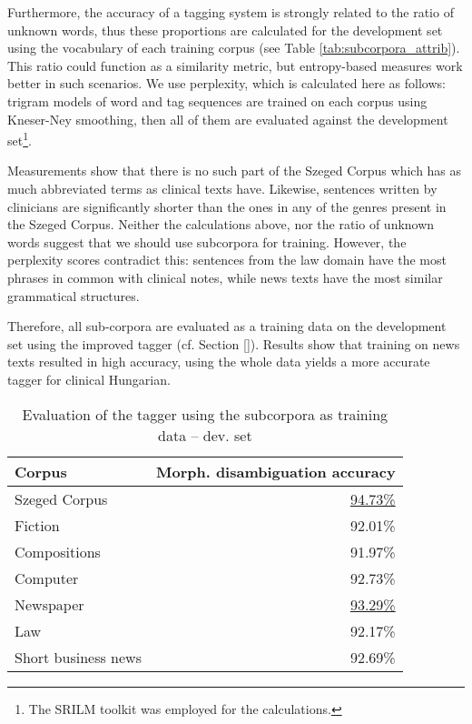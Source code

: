 Furthermore, the accuracy of a tagging system is strongly related to the ratio of unknown words, thus these proportions are calculated for the development set using the vocabulary of each training corpus (see Table \ref{tab:subcorpora_attrib}). This ratio could function as a similarity metric, but entropy-based measures work better \cite{kilgarriff1998measures} in such scenarios. We use perplexity, which is calculated here as follows: trigram models of word and tag sequences are trained on each corpus using Kneser-Ney smoothing, then all of them are evaluated against the development set\footnote{The SRILM toolkit \cite{stolcke2002srilm} was employed for the calculations.}.

Measurements show that there is no such part of the Szeged Corpus which has as much abbreviated terms as clinical texts have. Likewise, sentences written by clinicians are significantly shorter than the ones in any of the genres present in the Szeged Corpus. Neither the calculations above, nor the ratio of unknown words suggest that we should use subcorpora for training. However, the perplexity scores contradict this: sentences from the law domain have the most phrases in common with clinical notes, while news texts have the most similar grammatical structures. 

Therefore, all sub-corpora are evaluated as a training data on the development set using the improved tagger (cf. Section \ref{}). Results show that training on news texts resulted in high accuracy, using the whole data yields a more accurate tagger for clinical Hungarian.

\begin{table}
\centering
\caption{Evaluation of the tagger using the subcorpora as training data -- dev. set}
\label{tab:eval_subcorpora}
\begin{tabular}{ l r } 
\hline
Corpus & Morph. disambiguation accuracy \\
\hline
Szeged Corpus & \underline{94.73\%} \\
\hspace{0.2cm} Fiction & 92.01\% \\
\hspace{0.2cm} Compositions & 91.97\% \\
\hspace{0.2cm} Computer & 92.73\% \\
\hspace{0.2cm} Newspaper & \underline{93.29\%} \\
\hspace{0.2cm} Law & 92.17\% \\
\hspace{0.2cm} Short business news & 92.69\% \\
\hline
\end{tabular}
\end{table}


